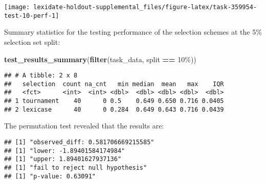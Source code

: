 \documentclass[
]{book}
\newenvironment{Shaded}{\begin{snugshade}}{\end{snugshade}}
\newcommand{\AttributeTok}[1]{\textcolor[rgb]{0.13,0.29,0.53}{#1}}
\newcommand{\DecValTok}[1]{\textcolor[rgb]{0.00,0.00,0.81}{#1}}
\newcommand{\FunctionTok}[1]{\textcolor[rgb]{0.13,0.29,0.53}{\textbf{#1}}}
\newcommand{\NormalTok}[1]{#1}
\newcommand{\OtherTok}[1]{\textcolor[rgb]{0.56,0.35,0.01}{#1}}
\newcommand{\SpecialCharTok}[1]{\textcolor[rgb]{0.81,0.36,0.00}{\textbf{#1}}}
\newcommand{\StringTok}[1]{\textcolor[rgb]{0.31,0.60,0.02}{#1}}
\begin{document}
\texttt{[image: lexidate-holdout-supplemental\_files/figure-latex/task-359954-test-10-perf-1]}

Summary statistics for the testing performance of the selection schemes at the 5\% selection set split:

\begin{Shaded}
\begin{Highlighting}[]
\FunctionTok{test\_results\_summary}\NormalTok{(}\FunctionTok{filter}\NormalTok{(task\_data, split }\SpecialCharTok{==} \StringTok{\textquotesingle{}10\%\textquotesingle{}}\NormalTok{))}
\end{Highlighting}
\end{Shaded}

\begin{verbatim}
## # A tibble: 2 x 8
##   selection  count na_cnt   min median  mean   max    IQR
##   <fct>      <int>  <int> <dbl>  <dbl> <dbl> <dbl>  <dbl>
## 1 tournament    40      0 0.5    0.649 0.650 0.716 0.0405
## 2 lexicase      40      0 0.284  0.649 0.643 0.716 0.0439
\end{verbatim}

The permutation test revealed that the results are:

\begin{Shaded}
\end{Shaded}

\begin{verbatim}
## [1] "observed_diff: 0.581706669215585"
## [1] "lower: -1.89401584174984"
## [1] "upper: 1.89401627937136"
## [1] "fail to reject null hypothesis"
## [1] "p-value: 0.63091"
\end{verbatim}
\end{document}
